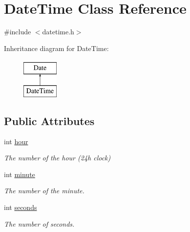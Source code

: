 \hypertarget{structDateTime}{\section{Date\-Time Class Reference}
\label{structDateTime}
}


{\ttfamily \#include $<$datetime.\-h$>$}

Inheritance diagram for Date\-Time\-:\begin{figure}[H]
\begin{center}
\leavevmode
\includegraphics[height=2.000000cm]{structDateTime}
\end{center}
\end{figure}
\subsection*{Public Attributes}
\begin{DoxyCompactItemize}
\item 
\hypertarget{structDateTime_a870c42c1a64681bcc8b67d57a5c9d53b}{int \hyperlink{structDateTime_a870c42c1a64681bcc8b67d57a5c9d53b}{hour}}\label{structDateTime_a870c42c1a64681bcc8b67d57a5c9d53b}

\begin{DoxyCompactList}\small\item\em The number of the hour (24h clock) \end{DoxyCompactList}\item 
\hypertarget{structDateTime_a968aece0ae2649712e90d93d4613e08f}{int \hyperlink{structDateTime_a968aece0ae2649712e90d93d4613e08f}{minute}}\label{structDateTime_a968aece0ae2649712e90d93d4613e08f}

\begin{DoxyCompactList}\small\item\em The number of the minute. \end{DoxyCompactList}\item 
\hypertarget{structDateTime_a0b36196a591d08b2512b02f7058560ee}{int \hyperlink{structDateTime_a0b36196a591d08b2512b02f7058560ee}{seconds}}\label{structDateTime_a0b36196a591d08b2512b02f7058560ee}

\begin{DoxyCompactList}\small\item\em The number of seconds. \end{DoxyCompactList}\end{DoxyCompactItemize}


